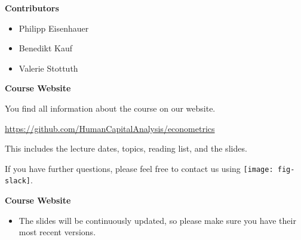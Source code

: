 \begin{frame}\textbf{Contributors}\vspace{0.3cm}

\begin{itemize}\setlength\itemsep{1em}
\item Philipp Eisenhauer
\item Benedikt Kauf
\item Valerie Stottuth
\end{itemize}

\end{frame}
\begin{frame}
	\textbf{Course Website}\vspace{0.3cm}

You find all information about the course on our website.

\begin{center}
\url{https://github.com/HumanCapitalAnalysis/econometrics}
\end{center}

This includes the lecture dates, topics, reading list, and the slides.\vspace{0.3cm}

If you have further questions, please feel free to contact us using
\texttt{[image: fig-slack]}.

\end{frame}
\begin{frame}
	\textbf{Course Website}\vspace{0.3cm}

\begin{itemize}
\item The slides will be continuously updated, so please make sure you have their most recent versions.
\end{itemize}

\end{frame}
